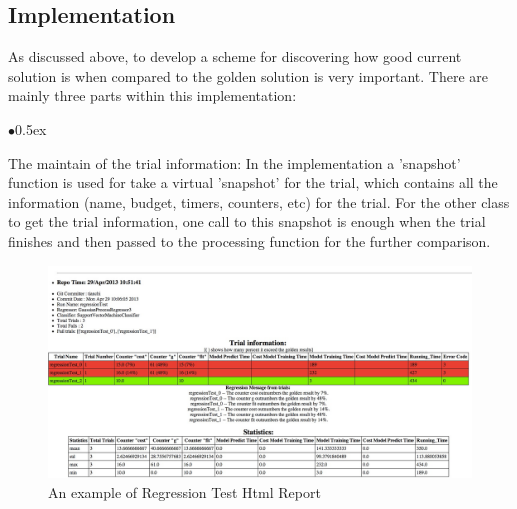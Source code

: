 \documentclass[11pt, runningheads,a4paper]{llncs}
\begin{document}
\subsection{Implementation}
As discussed above, to develop a scheme for discovering how good current solution is when compared to the golden solution is very important. There are mainly three parts within this implementation:
\begin{list}{$\bullet$}{\itemsep 0.5ex}
\item The maintain of the trial information: In the implementation a 'snapshot' function is used for take a virtual 'snapshot' for the trial, which contains all the information (name, budget, timers, counters, etc) for the trial. For the other class to get the trial information, one call to this snapshot is enough when the trial finishes and then passed to the processing function for the further comparison.
\begin{figure}
        \centering
    \centering
\includegraphics[width=1\textwidth]{./figs/regTest.png}
        \caption{An example of Regression Test Html Report}\label{fig:regtest}
\end{figure}


\end{list}
\end{document}
